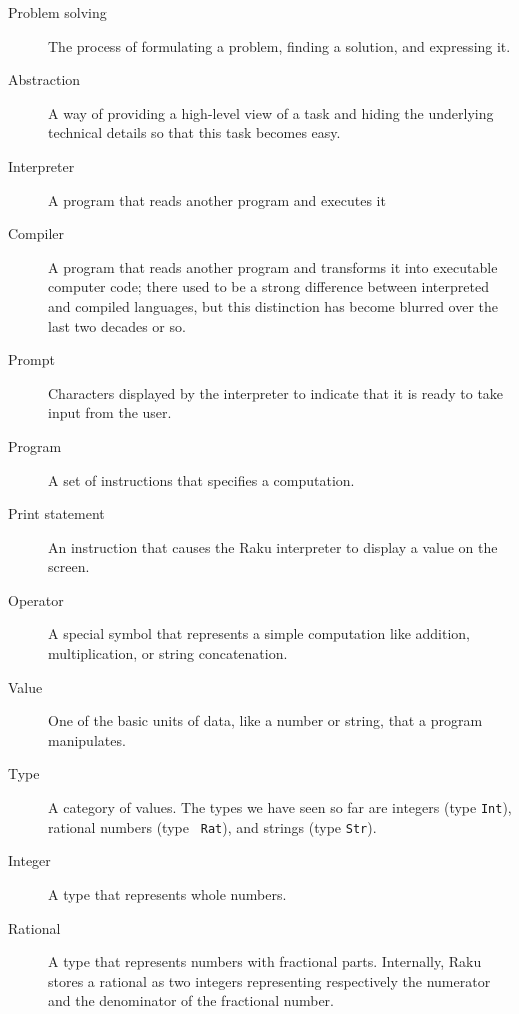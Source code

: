 \begin{description}

\item[Problem solving]  The process of formulating a problem, finding
a solution, and expressing it.

\item[Abstraction] A way of providing a high-level view 
of a task and hiding the underlying technical details so 
that this task becomes easy.

\item[Interpreter]  A program that reads another program and executes it

\item[Compiler]  A program that reads another program and 
transforms it into executable computer code; there used to be 
a strong difference between interpreted and compiled languages, 
but this distinction has become blurred over the last 
two decades or so.

\item[Prompt] Characters displayed by the interpreter to indicate
that it is ready to take input from the user.

\item[Program] A set of instructions that specifies a computation.

\item[Print statement]  An instruction that causes the Raku
interpreter to display a value on the screen.

\item[Operator]  A special symbol that represents a simple computation like
addition, multiplication, or string concatenation.

\item[Value]  One of the basic units of data, like a number or string, 
that a program manipulates.

\item[Type] A category of values.  The types we have seen so far
are integers (type {\tt Int}), rational numbers (type {\tt
Rat}), and strings (type {\tt Str}).

\item[Integer] A type that represents whole numbers.

\item[Rational] A type that represents numbers with fractional
parts. Internally, Raku stores a rational as two integers 
representing respectively the numerator and the denominator 
of the fractional number.


\end{description}
